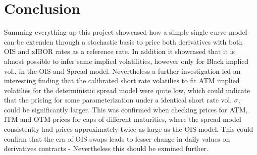 \documentclass[12pt]{article}
\begin{document}
\section{Conclusion} %
\label{sec:conclusion_and_reflections}
Summing everything up
this project showcased
how a simple single curve model can be extenden
through a stochastic basis to price both derivatives
with both OIS and xIBOR rates as a reference rate.
In addition it showcased that it is almost possible to
infer same implied volatilities,
however only for Black implied vol.,
in the OIS and Spread model.
Nevertheless a further investigation
led an interesting finding that
the calibrated short rate volatilies to fit ATM implied volatilies
for the deterministic spread
model were quite low, which could indicate that the pricing
for some parameterization under a identical short rate vol, $\sigma$,
could be significantly larger. This
was confirmed when checking prices for ATM, ITM and OTM prices
for caps of different maturities, where the spread model
consistently had prices approximately twice as large as the OIS model.
This
could confirm that the era of OIS swaps
leads to lesser change in daily values on
derivatives contracts - Nevertheless this should be exmined further.

\textbf{}
\newpage
\printbibliography[heading=bibintoc]
\end{document}
